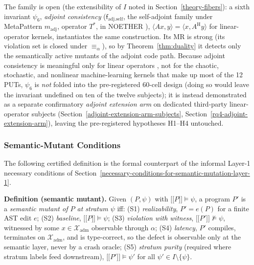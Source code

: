\documentclass[manuscript,screen,review]{acmart}
\begin{document}
The family is open (the extensibility of $I$ noted in Section~\ref{theory-fibers}): a sixth
invariant $\psi_6$, \emph{adjoint consistency} ($\mathsf{f}_{\mathrm{adj.self}}$,
the self-adjoint family under MetaPattern $m_{\mathrm{adj}}$, operator $T^{*}$,
in NOETHER \citep{noether2026}),
$\langle A x, y\rangle = \langle x, A^{\mathrm{H}} y\rangle$ for
linear-operator kernels, instantiates the same construction. Its MR is
strong (its violation set is closed under $\equiv_\alpha$), so by
Theorem~\ref{thm:duality} it detects only the semantically active mutants of the adjoint code
path. Because adjoint consistency is meaningful only for linear operators
, not for the chaotic, stochastic, and nonlinear machine-learning
kernels that make up most of the 12 PUTs, $\psi_6$ is \emph{not} folded
into the pre-registered 60-cell design (doing so would leave the invariant
undefined on ten of the twelve subjects); it is instead demonstrated as a
separate confirmatory \emph{adjoint extension arm} on dedicated
third-party linear-operator subjects (Section~\ref{adjoint-extension-arm-subjects}, Section~\ref{rq4-adjoint-extension-arm}), leaving the
pre-registered hypotheses H1--H4 untouched.

\subsubsection{Semantic-Mutant Conditions}\label{theory-s1s5}

The following certified definition is the formal counterpart of the
informal Layer-1 necessary conditions of Section~\ref{necessary-conditions-for-semantic-mutation-layer-1}.

\textbf{Definition (semantic mutant).} Given $(P, \psi)$ with
$\mathopen{\lbrack\!\lbrack} P \mathclose{\rbrack\!\rbrack} \models \psi$, a program $P'$ is a
\emph{semantic mutant of $P$ at stratum $\psi$} iff: (S1)
\emph{realizability}, $P' = e(P)$ for a finite AST edit $e$; (S2)
\emph{baseline}, $\mathopen{\lbrack\!\lbrack} P \mathclose{\rbrack\!\rbrack} \models \psi$; (S3)
\emph{violation with witness},
$\mathopen{\lbrack\!\lbrack} P' \mathclose{\rbrack\!\rbrack} \not\models \psi$, witnessed by some
$x \in \mathcal{X}_{\mathrm{adm}}$ observable through $\alpha$; (S4)
\emph{latency}, $P'$ compiles, terminates on $\mathcal{X}_{\mathrm{adm}}$,
and is type-correct, so the defect is observable only at the semantic
layer, never by a crash oracle; (S5) \emph{stratum purity} (required
where stratum labels feed downstream),
$\mathopen{\lbrack\!\lbrack} P' \mathclose{\rbrack\!\rbrack} \models \psi'$ for all
$\psi' \in I \setminus \{\psi\}$.
\end{document}
